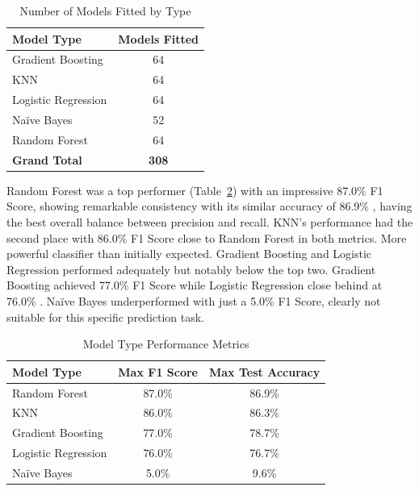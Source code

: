 		\begin{table}[ht]
			\centering
			\begin{tabular}{|l|c|}
				\hline
				\textbf{Model Type} & \textbf{Models Fitted} \\
				\hline
				Gradient Boosting       & 64                     \\
				KNN                     & 64                     \\
				Logistic Regression     & 64                     \\
				Naïve Bayes             & 52                     \\
				Random Forest           & 64                     \\
				\hline
				\textbf{Grand Total}    & \textbf{308}           \\
				\hline
			\end{tabular}
			\caption{Number of Models Fitted by Type}
			\label{tab:model-type-counts}
		\end{table}

		Random Forest was a top performer (Table~\ref{tab:model-type-performance}) with an impressive 87.0\%
		F1 Score, showing remarkable consistency with its similar accuracy of 86.9\%
		, having the best overall balance between precision and recall.
		KNN's performance had the second place with 86.0\%
		F1 Score close to Random Forest in both metrics. More powerful classifier than initially expected.
		Gradient Boosting and Logistic Regression performed adequately but notably below the top two. Gradient
		Boosting achieved 77.0\% F1 Score while Logistic Regression close behind at 76.0\%
		. Naïve Bayes underperformed with just a 5.0\%
		F1 Score, clearly not suitable for this specific prediction task.

		\begin{table}[ht]
			\centering
			\begin{tabular}{|l|c|c|}
				\hline
				\textbf{Model Type} & \textbf{Max F1 Score} & \textbf{Max Test Accuracy} \\
				\hline
				Random Forest           & 87.0\%                & 86.9\%                     \\
				KNN                     & 86.0\%                & 86.3\%                     \\
				Gradient Boosting       & 77.0\%                & 78.7\%                     \\
				Logistic Regression     & 76.0\%                & 76.7\%                     \\
				Naïve Bayes             & 5.0\%                 & 9.6\%                      \\
				\hline
			\end{tabular}
			\caption{Model Type Performance Metrics}
			\label{tab:model-type-performance}
		\end{table}

